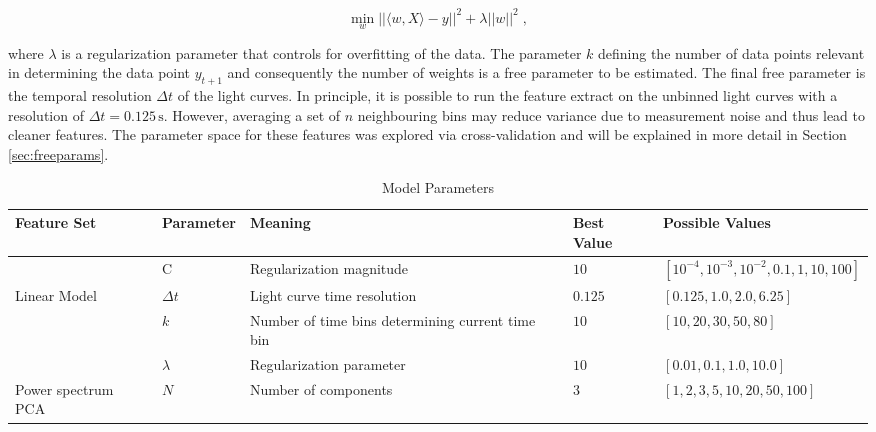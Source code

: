 \documentclass[12pt]{emulateapj}
\begin{document}
\begin{equation}
\min_w ||\langle w, X \rangle - y||^2 + \lambda ||w||^2 \; ,
\end{equation}

\noindent where $\lambda$ is a regularization parameter that controls for overfitting of the data. The parameter $k$ defining the number of data points relevant in determining the data point $y_{t+1}$ and consequently the number of weights is a free parameter to be estimated. The final free parameter is the temporal resolution $\Delta t$ of the light curves. In principle, it is possible to run the feature extract on the unbinned light curves with a resolution of $\Delta t = 0.125\,\mathrm{s}$. However, averaging a set of $n$ neighbouring bins may reduce variance due to measurement noise and thus lead to cleaner features. The parameter space for these features was explored via cross-validation and will be explained in more detail in Section \ref{sec:freeparams}.

\begin{table}[hbtp]
\renewcommand{\arraystretch}{1.3}
\footnotesize
\caption{Model Parameters}
\begin{threeparttable} 
\begin{tabularx}{\textwidth}{p{2.0cm}p{2.0cm}p{5.0cm}p{1.0cm}p{6.0cm}}
\toprule
\bf{Feature Set} & \bf{Parameter} & \bf{Meaning} & Best Value &  \bf{Possible Values} \\ \midrule
		& C & Regularization magnitude & $10$ & $[10^{-4}, 10^{-3}, 10^{-2}, 0.1, 1, 10, 100]$ \\ \midrule
 Linear Model & $\Delta t$ & Light curve time resolution & $0.125$ & $[0.125, 1.0, 2.0, 6.25]$ \\
		& $k$ & Number of time bins determining current time bin & $10$ & $[10, 20, 30, 50, 80]$ \\
		& $\lambda$ & Regularization parameter & $10$ & $[0.01, 0.1, 1.0, 10.0]$ \\ \midrule
Power spectrum PCA & $N$ & Number of components & $3$ & $[1,2,3,5,10,20,50,100]$ \\

 \bottomrule
\end{tabularx}
   \begin{tablenotes}
      \item{}
\end{tablenotes}
\end{threeparttable}
\label{table:parameters}
\end{table}
\end{document}
